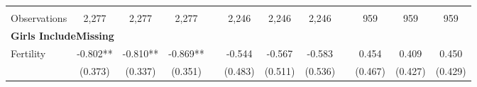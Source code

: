 \begin{landscape}
\begin{table}[htpb!]
\begin{center}
\begin{tabular}{lcccp{2mm}cccp{2mm}ccc}
\begin{footnotesize}\end{footnotesize}&\begin{footnotesize}\end{footnotesize}&\begin{footnotesize}\end{footnotesize}&\begin{footnotesize}\end{footnotesize}&\begin{footnotesize}\end{footnotesize}&\begin{footnotesize}\end{footnotesize}&\begin{footnotesize}\end{footnotesize}&\begin{footnotesize}\end{footnotesize}&\begin{footnotesize}\end{footnotesize}&\begin{footnotesize}\end{footnotesize}&\begin{footnotesize}\end{footnotesize}&\begin{footnotesize}\end{footnotesize}\\Observations&2,277&2,277&2,277&&2,246&2,246&2,246&&959&959&959\\
\multicolumn{12}{l}{\textbf{Girls IncludeMissing}}\\ 
Fertility&-0.802**&-0.810**&-0.869**&&-0.544&-0.567&-0.583&&0.454&0.409&0.450\\
&(0.373)&(0.337)&(0.351)&&(0.483)&(0.511)&(0.536)&&(0.467)&(0.427)&(0.429)\\

\end{tabular}
\end{center}
\end{table}
\end{landscape}
